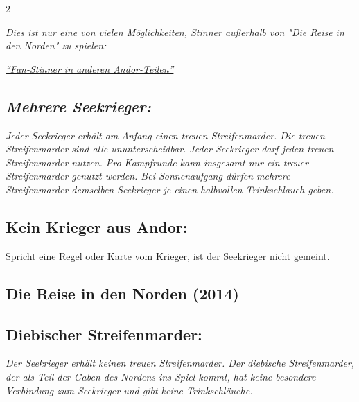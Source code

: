 \documentclass[10pt, a4paper, oneside]{book}
\newcommand{\fan}[1]{\textit{#1}}
\begin{document}
\begin{multicols*}{2}
\begin{nobgcolor}
\fan{Dies ist nur eine von vielen Möglichkeiten, Stinner außerhalb von "Die Reise in den Norden" zu spielen:}

\href{https://legenden-von-andor.de/forum/viewtopic.php?p=126785#p126785}
{\blacktriangleright \fan{\enquote{Fan-Stinner in anderen Andor-Teilen}}}








\subsection{\fan{Mehrere Seekrieger:}}

\fan{Jeder Seekrieger erhält am Anfang einen treuen Streifenmarder. Die treuen Streifenmarder sind alle ununterscheidbar. Jeder Seekrieger darf jeden treuen Streifenmarder nutzen. Pro Kampfrunde kann insgesamt nur ein treuer Streifenmarder genutzt werden. Bei Sonnenaufgang dürfen mehrere Streifenmarder demselben Seekrieger je einen halbvollen Trinkschlauch geben.}



\subsection{Kein Krieger aus Andor:}

Spricht eine Regel oder Karte vom \hyperref[Krieger]{Krieger}, ist der Seekrieger nicht gemeint.



\end{nobgcolor}



\columnbreak




\begin{bgcolor}
\section{Die Reise in den Norden (2014)}

\subsection{Diebischer Streifenmarder:}

\fan{Der Seekrieger erhält keinen treuen Streifenmarder. Der diebische Streifenmarder, der als Teil der Gaben des Nordens ins Spiel kommt, hat keine besondere Verbindung zum Seekrieger und gibt keine Trinkschläuche.}




\end{bgcolor}
\end{multicols*}
\end{document}
